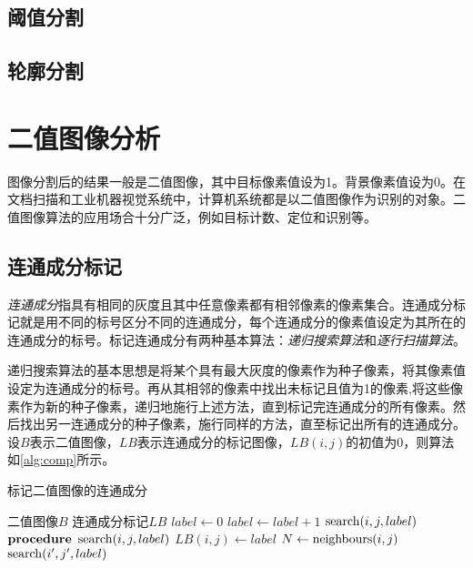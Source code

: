 \subsection{阈值分割}


\subsection{轮廓分割}

\section{二值图像分析}

图像分割后的结果一般是二值图像，其中目标像素值设为1。背景像素值设为0。在文档扫描和工业机器视觉系统中，计算机系统都是以二值图像作为识别的对象。二值图像算法的应用场合十分广泛，例如目标计数、定位和识别等。

\subsection{连通成分标记}

\emph{连通成分}指具有相同的灰度且其中任意像素都有相邻像素的像素集合。连通成分标记就是用不同的标号区分不同的连通成分，每个连通成分的像素值设定为其所在的连通成分的标号。标记连通成分有两种基本算法：\emph{递归搜索算法}和\emph{逐行扫描算法}。

递归搜索算法的基本思想是将某个具有最大灰度的像素作为种子像素，将其像素值设定为连通成分的标号。再从其相邻的像素中找出未标记且值为1的像素,将这些像素作为新的种子像素，递归地施行上述方法，直到标记完连通成分的所有像素。然后找出另一连通成分的种子像素，施行同样的方法，直至标记出所有的连通成分。设$B$表示二值图像，$LB$表示连通成分的标记图像，$LB(i,j)$的初值为0，则算法如\ref{alg:comp}所示。
\begin{algorithm}[H]
  \caption{标记二值图像的连通成分}
  \label{alg:comp}
  \begin{algorithmic}
    \REQUIRE $\textrm{二值图像}B$
    \ENSURE $\textrm{连通成分标记}LB$
    \STATE $label\gets 0$
    \STATE $label\gets label+1$
    \STATE $\operatorname{search}(i,j,label)$
    \ENDIF
    \ENDFOR
    \ENDFOR
    \STATE $\textbf{procedure}\ \operatorname{search}(i,j,label)$
    \STATE $LB(i,j)\gets label$
    \STATE $N\gets \operatorname{neighbours}(i,j)$
    \STATE $\operatorname{search}(i',j',label)$
    \ENDIF
    \ENDFOR
  \end{algorithmic}
\end{algorithm}

